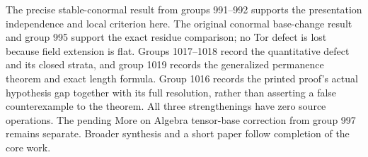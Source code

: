 The precise stable-conormal result from groups 991--992 supports the presentation independence and local criterion here. The original conormal base-change result and group 995 support the exact residue comparison; no Tor defect is lost because field extension is flat. Groups 1017--1018 record the quantitative defect and its closed strata, and group 1019 records the generalized permanence theorem and exact length formula. Group 1016 records the printed proof's actual hypothesis gap together with its full resolution, rather than asserting a false counterexample to the theorem. All three strengthenings have zero source operations. The pending More on Algebra tensor-base correction from group 997 remains separate. Broader synthesis and a short paper follow completion of the core work.
